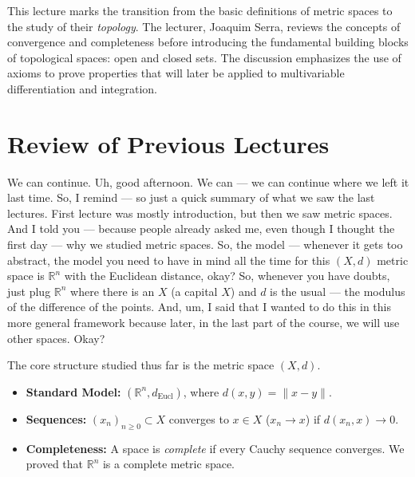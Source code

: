 
\begin{nice-box}[Context]
This lecture marks the transition from the basic definitions of metric spaces to the study of their \emph{topology}. The lecturer, Joaquim Serra, reviews the concepts of convergence and completeness before introducing the fundamental building blocks of topological spaces: open and closed sets. The discussion emphasizes the use of axioms to prove properties that will later be applied to multivariable differentiation and integration.
\end{nice-box}

\section{Review of Previous Lectures}

\begin{spoken-clean}[00:00:00 - 00:01:51]
We can continue. Uh, good afternoon. We can --- we can continue where we left it last time. So, I remind --- so just a quick summary of what we saw the last lectures. First lecture was mostly introduction, but then we saw metric spaces. And I told you --- because people already asked me, even though I thought the first day --- why we studied metric spaces. So, the model --- whenever it gets too abstract, the model you need to have in mind all the time for this $(X, d)$ metric space is $\mathbb{R}^n$ with the Euclidean distance, okay? So, whenever you have doubts, just plug $\mathbb{R}^n$ where there is an $X$ (a capital $X$) and $d$ is the usual --- the modulus of the difference of the points. And, um, I said that I wanted to do this in this more general framework because later, in the last part of the course, we will use other spaces. Okay?
\end{spoken-clean}

\begin{math-stroke}
\begin{ai-type-check-invisible-content}
\end{ai-type-check-invisible-content}
The core structure studied thus far is the metric space $(X, d)$.
\begin{itemize}
    \item \textbf{Standard Model:} $(\mathbb{R}^n, d_{\text{Eucl}})$, where $d(x, y) = \|x - y\|$.
    \item \textbf{Sequences:} $(x_n)_{n \ge 0} \subset X$ converges to $x \in X$ ($x_n \to x$) if $d(x_n, x) \to 0$.
    \item \textbf{Completeness:} A space is \emph{complete} if every Cauchy sequence converges. We proved that $\mathbb{R}^n$ is a complete metric space.
\end{itemize}
\end{math-stroke}

